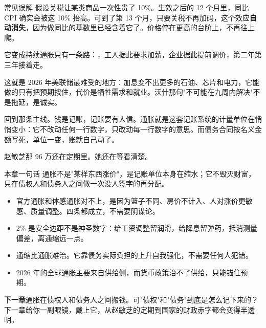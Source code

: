 \begin{mythbox}{常见误解}
假设关税让某类商品一次性贵了 10\%。生效之后的 12 个月里，同比 CPI 确实会被这 10\% 抬高。可到了第 13 个月，只要关税不再加码，这个效应\textbf{自动消失}，因为做同比的基数里已经含着它了。价格停在更高的台阶上，不再往上爬。

它变成持续通胀只有一条路：，工人据此要求加薪，企业据此提前调价，第二年第三年接着走。

这就是 2026 年美联储最难受的地方：加息变不出更多的石油、芯片和电力，它能做的只有把预期按住，代价是牺牲需求和就业。沃什那句"不可能在九周内解决"不是拖延，是诚实。

\end{mythbox}

\bookbreak

回到那条主线。钱是记账，记账要有人信。通胀就是这套记账系统的计量单位在悄悄变小：它不改动任何一行数字，只改动每一行数字的意思。而债务合同按名义金额写死，单位一变，账就自己动了。

赵敏芝那 96 万还在定期里。她还在等看清楚。

\begin{takeaway}{本章一句话}
通胀不是"某样东西涨价"，是记账单位本身在缩水；它不毁灭财富，只在债权人和债务人之间做一次没人签字的再分配。

\begin{itemize}
  \item 官方通胀和体感通胀对不上，是因为篮子不同、房价不计入、人对涨价更敏感、质量调整。四条都成立，不需要阴谋论。
  \item 2\% 是安全边距不是神圣数字：给工资调整留润滑，给降息留弹药，抵消测量偏差，离通缩远一点。
  \item 通缩比通胀难治。它靠债务实际负担的上升自我强化，不需要任何人犯错。
  \item 2026 年的全球通胀主要来自供给侧，而货币政策治不了供给，只能锚住预期。
\end{itemize}

\end{takeaway}

\begin{bridgebox}
\textbf{下一章}通胀在债权人和债务人之间搬钱。可"债权"和"债务"到底是怎么记下来的？下一章给你一副眼镜，戴上它，从赵敏芝的定期到国家的财政赤字都会变得半透明。
\end{bridgebox}

